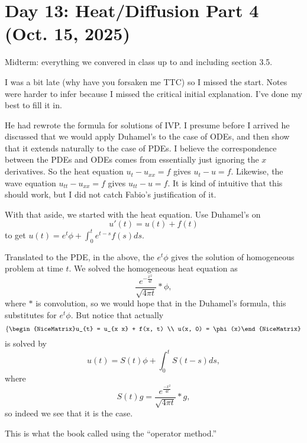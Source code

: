 \section{Day 13: Heat/Diffusion Part 4 (Oct. 15, 2025)}
Midterm: everything we convered in class up to and including section 3.5.

I was a bit late (why have you forsaken me TTC) so I missed the start. Notes were harder to infer because I missed the critical initial explanation. I've done my best to fill it in.

He had rewrote the formula for solutions of IVP\@. I presume before I arrived he discussed that we would apply Duhamel's to the case of ODEs, and then show that it extends naturally to the case of PDEs. I believe the correspondence between the PDEs and ODEs comes from essentially just ignoring the \( x \) derivatives. So the heat equation \( u_{t} - u_{x x} = f \) gives \( u_{t} - u = f \).  Likewise, the wave equation \( u_{t t} - u_{x x} =f \) gives \( u_{t t} - u = f \). It is kind of intuitive that this should work, but I did not catch Fabio's justification of it.

With that aside, we started with the heat equation. Use Duhamel's on
\[ u'(t) = u(t) + f(t) \]
to get \( u(t) = e^{t} \phi + \int_{0}^{t} e^{t-s} f(s) ds \).

Translated to the PDE, in the above, the \( e^{t} \phi \) gives the solution of homogeneous problem at time \( t \). We solved the homogeneous heat equation as 
\[ \frac{e^{- \frac{x^{2}}{4t}}}{\sqrt{4 \pi t}} * \phi, \]
where \( * \) is convolution, so we would hope that in the Duhamel's formula, this substitutes for \( e^{t} \phi \). But notice that actually
\[ \left\{\begin{NiceMatrix}u_{t} = u_{x x} + f(x, t) \\ u(x, 0) = \phi(x)\end{NiceMatrix}\right.  \]
is solved by
\[ u(t) = S(t) \phi + \int_{0}^{t} S(t - s) ds, \]
where
\[ S(t) g = \frac{e^{\frac{-x^{2}}{4t}}}{\sqrt{4 \pi t}} * g, \]
so indeed we see that it is the case.

This is what the book called using the ``operator method.''

